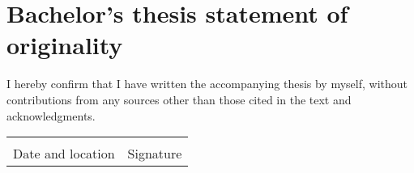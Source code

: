 \thispagestyle{empty}
\section*{Bachelor’s thesis statement of originality}

I hereby confirm that I have written the accompanying thesis by myself, without contributions from any sources other than those cited in the text and acknowledgments.

\vspace*{5em}

\noindent
\begin{tabular}{@{}p{2.5in}p{2.5in}@{}}
    \dotfill & \dotfill \\
    \centering Date and location & \centering Signature
\end{tabular}
